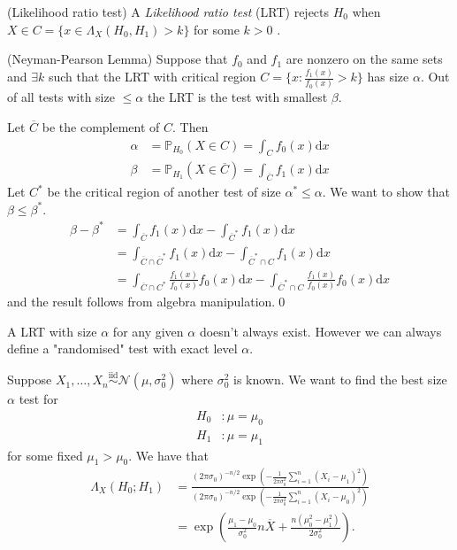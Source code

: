 \documentclass{article}
\newcommand{\iid}{\overset{\text{iid}}{\sim}}
\begin{document}
\begin{definition}
	(Likelihood ratio test) A \textit{Likelihood ratio test} (LRT) rejects $ H_0 $ when $ X\in C=\{x\in \Lambda_X(H_0,H_1)>k\} $ for some $ k>0$ .
\end{definition}
\begin{theorem}
	(Neyman-Pearson Lemma) Suppose that $ f_0 $ and $ f_1 $ are nonzero on the same sets and $ \exists k$ such that the LRT with critical region $ C=\{x: \frac{f_1(x)}{f_0(x)}>k\} $ has size $ \alpha $. Out of all tests with size $ \le\alpha $ the LRT is the test with smallest $ \beta $.
\end{theorem}
\pf Let $ \overline C $ be the complement of $ C $. Then
\begin{align*}
	\alpha &= \mathbb P_{H_0}(X\in C) = \int_C f_0(x)\mathrm dx\\
	\beta &= \mathbb P_{H_1}(X\in \overline C) = \int_{\overline C}f_1(x)\mathrm dx
\end{align*}
Let $ C^* $ be the critical region of another test of size $ \alpha^*\le \alpha $. We want to show that $ \beta\le\beta^* $.
\begin{align*}
	\beta-\beta^*&=\int_{\overline C} f_1(x)\mathrm dx-\int_{\overline C^*}f_1(x)\mathrm dx\\
		     &= \int_{\overline C\cap \overline C^*} f_1(x)\mathrm dx-\int_{\overline C^*\cap C} f_1(x)\mathrm dx\\
		     &= \int_{\overline C \cap C^*}\frac{f_1(x)}{f_0(x)}f_0(x)\mathrm dx-\int_{\overline C^*\cap C}\frac{f_1(x)}{f_0(x)}f_0(x)\mathrm dx
\end{align*}
and the result follows from algebra manipulation.\qed
\begin{remark}
  A LRT with size $ \alpha $ for any given $ \alpha $ doesn't always exist. However we can always define a "randomised" test with exact level $ \alpha $.
\end{remark}
Suppose $ X_1,\dots, X_n \iid \mathcal N(\mu , \sigma^2_0)$ where $ \sigma^2_0 $ is known. We want to find the best size $ \alpha $ test for
\begin{align*}
	H_0 &: \mu = \mu_0 \\
	H_1 &: \mu = \mu_1
\end{align*}
for some fixed $ \mu_1 > \mu_0 $. We have that
\begin{align*}
	\Lambda_X(H_0;H_1) &= \frac{(2\pi \sigma_0)^{-n/2} \exp\left(-\frac1{2\pi \sigma^2_0} \sum_{i=1}^n (X_i - \mu_1)^2\right)}{(2\pi \sigma_0)^{-n/2} \exp\left(-\frac1{2\pi \sigma^2_0} \sum_{i=1}^n (X_i - \mu_0)^2\right)}\\
			   &= \exp\left(\frac{\mu_1 - \mu_0}{\sigma^2_0} n\overline X + \frac{n(\mu_0^2 - \mu_1^2)}{2\sigma_0^2}\right).
\end{align*}
\end{document}
